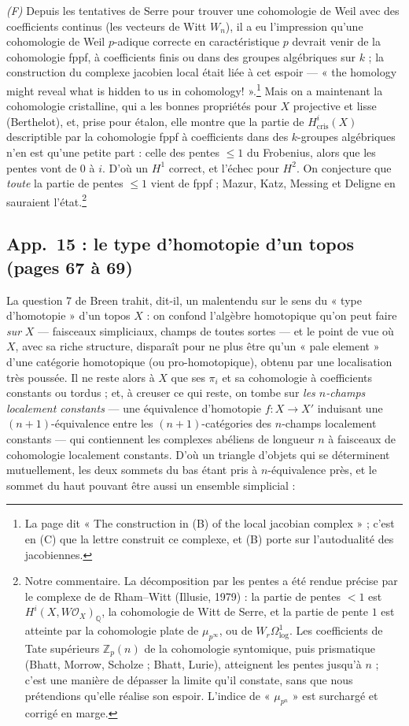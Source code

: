 \documentclass[11pt,a4paper]{article}
\begin{document}
\emph{(F)} Depuis les tentatives de Serre pour trouver une cohomologie de
Weil avec des coefficients continus (les vecteurs de Witt $W_n$), il a eu
l'impression qu'une cohomologie de Weil $p$-adique correcte en
caractéristique $p$ devrait venir de la cohomologie fppf, à coefficients
finis ou dans des groupes algébriques sur $k$ ; la construction du complexe
jacobien local était liée à cet espoir --- « the homology might reveal what
is hidden to us in cohomology! ».\footnote{La page dit « The construction in
(B) of the local jacobian complex » ; c'est en (C) que la lettre construit
ce complexe, et (B) porte sur l'autodualité des jacobiennes.} Mais on a
maintenant la cohomologie cristalline, qui a les bonnes propriétés pour $X$
projective et lisse (Berthelot), et, prise pour étalon, elle montre que la
partie de $H^i_{\mathrm{cris}}(X)$ descriptible par la cohomologie fppf à
coefficients dans des $k$-groupes algébriques n'en est qu'une petite part :
celle des pentes $\leqslant 1$ du Frobenius, alors que les pentes vont de $0$
à $i$. D'où un $H^1$ correct, et l'échec pour $H^2$. On conjecture que
\emph{toute} la partie de pentes $\leqslant 1$ vient de fppf ; Mazur, Katz,
Messing et Deligne en sauraient l'état.\footnote{Notre commentaire. La
décomposition par les pentes a été rendue précise par le complexe de
de Rham--Witt (Illusie, 1979) : la partie de pentes $< 1$ est
$H^i(X,W\mathcal{O}_X)_{\mathbb{Q}}$, la cohomologie de Witt de Serre, et la
partie de pente $1$ est atteinte par la cohomologie plate de $\mu_{p^\infty}$,
ou de $W_r\Omega^1_{\log}$. Les coefficients de Tate supérieurs
$\mathbb{Z}_p(n)$ de la cohomologie syntomique, puis prismatique
(Bhatt, Morrow, Scholze ; Bhatt, Lurie), atteignent les pentes jusqu'à $n$ ;
c'est une manière de dépasser la limite qu'il constate, sans que nous
prétendions qu'elle réalise son espoir. L'indice de « $\mu_{p^n}$ » est
surchargé et corrigé en marge.}

\subsection*{App.~15 : le type d'homotopie d'un topos (pages 67 à 69)}

La question 7 de Breen trahit, dit-il, un malentendu sur le sens du « type
d'homotopie » d'un topos $X$ : on confond l'algèbre homotopique qu'on peut
faire \emph{sur} $X$ --- faisceaux simpliciaux, champs de toutes sortes ---
et le point de vue où $X$, avec sa riche structure, disparaît pour ne plus
être qu'un « pale element » d'une catégorie homotopique (ou
pro-homotopique), obtenu par une localisation très poussée. Il ne reste
alors à $X$ que ses $\pi_i$ et sa cohomologie à coefficients constants ou
tordus ; et, à creuser ce qui reste, on tombe sur \emph{les $n$-champs
localement constants} --- une équivalence d'homotopie $f : X \to X'$
induisant une $(n+1)$-équivalence entre les $(n+1)$-catégories des
$n$-champs localement constants --- qui contiennent les complexes abéliens
de longueur $n$ à faisceaux de cohomologie localement constants. D'où un
triangle d'objets qui se déterminent mutuellement, les deux sommets du bas
étant pris à $n$-équivalence près, et le sommet du haut pouvant être aussi
un ensemble simplicial :
\end{document}
